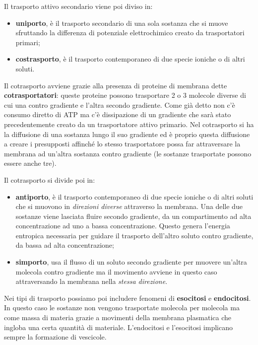 \documentclass[]{article}
\begin{document}
Il trasporto attivo secondario viene poi diviso in:

\begin{itemize}
\itemsep1pt\parskip0pt
\item
  \textbf{uniporto}, è il trasporto secondario di una sola sostanza che
  si muove sfruttando la differenza di potenziale elettrochimico creato
  da trasportatori primari;
\item
  \textbf{costrasporto}, è il trasporto contemporaneo di due specie
  ioniche o di altri soluti.
\end{itemize}

Il cotrasporto avviene grazie alla presenza di proteine di membrana
dette \textbf{cotrasportatori}: queste proteine possono trasportare 2 o
3 molecole diverse di cui una contro gradiente e l'altra secondo
gradiente. Come già detto non c'è consumo diretto di ATP ma c'è
dissipazione di un gradiente che sarà stato precedentemente creato da un
trasportatore attivo primario. Nel cotrasporto si ha la diffusione di
una sostanza lungo il suo gradiente ed è proprio questa diffusione a
creare i presupposti affinché lo stesso trasportatore possa far
attraversare la membrana ad un'altra sostanza contro gradiente (le
sostanze trasportate possono essere anche tre).

Il cotrasporto si divide poi in:

\begin{itemize}
\itemsep1pt\parskip0pt
\item
  \textbf{antiporto}, è il trasporto contemporaneo di due specie ioniche
  o di altri soluti che si muovono in \emph{direzioni diverse}
  attraverso la membrana. Una delle due sostanze viene lasciata fluire
  secondo gradiente, da un compartimento ad alta concentrazione ad uno a
  bassa concentrazione. Questo genera l'energia entropica necessaria per
  guidare il trasporto dell'altro soluto contro gradiente, da bassa ad
  alta concentrazione;
\item
  \textbf{simporto}, usa il flusso di un soluto secondo gradiente per
  muovere un'altra molecola contro gradiente ma il movimento avviene in
  questo caso attraversando la membrana nella \emph{stessa direzione}.
\end{itemize}

Nei tipi di trasporto possiamo poi includere fenomeni di
\textbf{esocitosi} e \textbf{endocitosi}. In questo caso le sostanze non
vengono trasportate molecola per molecola ma come massa di materia
grazie a movimenti della membrana plasmatica che ingloba una certa
quantità di materiale. L'endocitosi e l'esocitosi implicano sempre la
formazione di vescicole.
\end{document}
